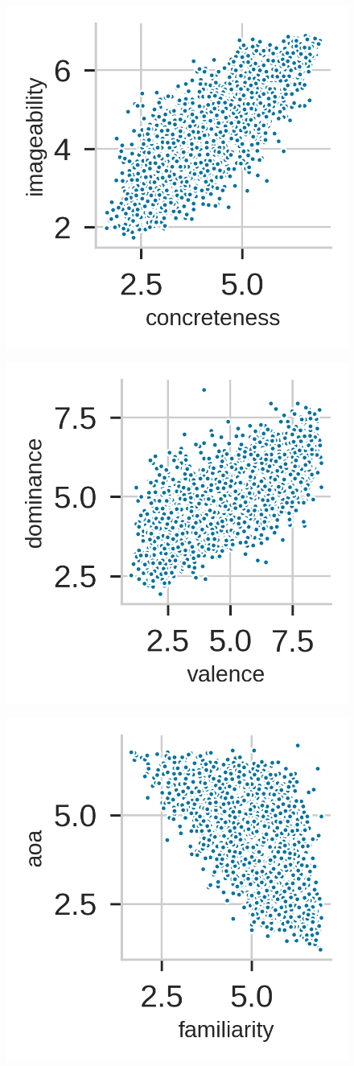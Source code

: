 \documentclass[a4paper,11pt,dvipsnames]{article}
\begin{document}
\begin{figure}[ht]
    \centering
    \begin{minipage}{0.3\textwidth}
    \centering
    \includegraphics[width=0.65\columnwidth]{Graphs/pp_imageability_concreteness.png}
    \label{fig:pairplot_ima_conc}
\end{minipage}
\begin{minipage}{0.3\textwidth}
\centering
    \includegraphics[width=0.65\columnwidth]{Graphs/pp_dominance_valence.png}
    \label{fig:pairplot_dom_val}
    \end{minipage}
    \begin{minipage}{0.3\textwidth}
    \centering
    \includegraphics[width=0.65\columnwidth]{Graphs/pp_aoa_familiarity.png}

\end{minipage}
\end{figure}
\end{document}
